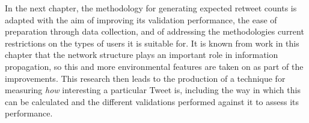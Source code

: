 In the next chapter, the methodology for generating expected retweet counts is adapted with the aim of improving its validation performance, the ease of preparation through data collection, and of addressing the methodologies current restrictions on the types of users it is suitable for. It is known from work in this chapter that the network structure plays an important role in information propagation, so this and more environmental features are taken on as part of the improvements. This research then leads to the production of a technique for measuring \textit{how} interesting a particular Tweet is, including the way in which this can be calculated and the different validations performed against it to assess its performance.
